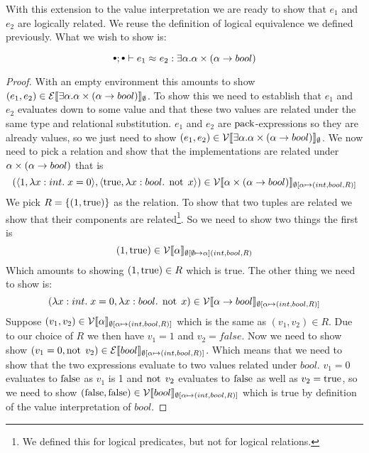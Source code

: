 With this extension to the value interpretation we are ready to show that $e_1$ and $e_2$ are logically related. We reuse the definition of logical equivalence we defined previously. What we wish to show is:

\begin{theorem}
\[
  \mtenv; \mtenv \vdash \lreq{e_1}{e_2} : \exists \alpha. \alpha \times (\tarrow{\alpha}{bool})
\]
\end{theorem}
\begin{proof}
  With an empty environment this amounts to show $(e_1,e_2) \in \eprep[\emptyset]{\exists \alpha. \alpha \times (\tarrow{\alpha}{bool})}$. To show this we need to establish that $e_1$ and $e_2$ evaluates down to some value and that these two values are related under the same type and relational substitution. $e_1$ and $e_2$ are $\epack$-expressions so they are already values, so we just need to show $(e_1,e_2) \in \vprep[\emptyset]{\exists \alpha. \alpha \times (\tarrow{\alpha}{bool})}$. We now need to pick a relation and show that the implementations are related under $\alpha \times (\tarrow{\alpha}{bool})$ that is 
  \[
  (\tuple{1, \tlabs{x}{int}{x=0}},\tuple{\true, \tlabs{x}{bool}{\enot\; x}}) \in \vprep[\extsub{\emptyset}{\alpha}{(int,bool,R)}]{\alpha \times (\tarrow{\alpha}{bool})}
  \]
  We pick $R=\{(1,\true)\}$ as the relation. To show that two tuples are related we show that their components are related\footnote{We defined this for logical predicates, but not for logical relations.}. So we need to show two things the first is
  \[
  (1,\true) \in \vprep[\extsub{\emptyset}{\emptyset}{\alpha}{(int,bool,R)}]{\alpha}
  \]
  Which amounts to showing $(1,\true) \in R$ which is true. The other thing we need to show is:
  \[
  (\tlabs{x}{int}{x=0},\tlabs{x}{bool}{\enot\; x}) \in \vprep[\extsub{\emptyset}{\alpha}{(int,bool,R)}]{\tarrow{\alpha}{bool}}
  \]
  Suppose $(v_1,v_2) \in \vprep[\extsub{\emptyset}{\alpha}{(int,bool,R)}]{\alpha}$ 
  which is the same as $(v_1,v_2) \in R$. Due to our choice of $R$ we then have $v_1 = 1$ and $v_2 = false$.
  Now we need to show show $(v_1 = 0,\enot\; v_2) \in \eprep[\extsub{\emptyset}{\alpha}{(int,bool,R)}]{bool}$. Which means that we need to show that the two expressions evaluate to two values related under $bool$. $v_1 = 0$ evaluates to $\false$ as $v_1$ is 1 and $\enot\; v_2$ evaluates to $\false$ as well as $v_2 = \true$, so we need to show $(\false,\false) \in \vprep[\extsub{\emptyset}{\alpha}{(int,bool,R)}]{bool}$ which is true by definition of the value interpretation of $bool$.
\end{proof}
\clearpage
